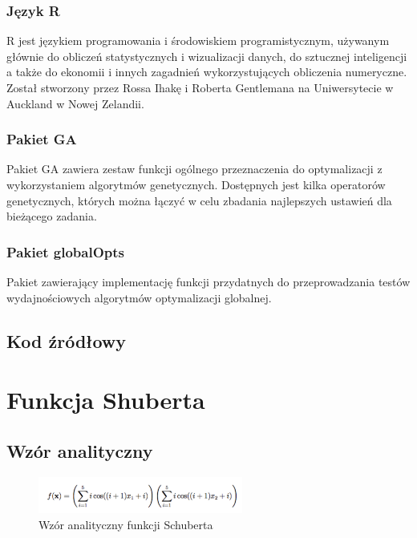 \documentclass{article}
\begin{document}
\subsubsection{Język R}
R jest językiem programowania i środowiskiem programistycznym, używanym głównie do obliczeń statystycznych i wizualizacji danych, do sztucznej inteligencji a także do ekonomii i innych zagadnień wykorzystujących obliczenia numeryczne. Został stworzony przez Rossa Ihakę i Roberta Gentlemana na Uniwersytecie w Auckland w Nowej Zelandii. 


\subsubsection{Pakiet GA}

Pakiet GA zawiera zestaw funkcji ogólnego przeznaczenia do optymalizacji z wykorzystaniem algorytmów genetycznych. Dostępnych jest kilka operatorów genetycznych, których można łączyć w celu zbadania najlepszych ustawień dla bieżącego zadania.


\subsubsection{Pakiet globalOpts}
Pakiet zawierający implementację funkcji przydatnych do przeprowadzania testów wydajnościowych algorytmów optymalizacji globalnej.

\subsection{Kod źródłowy}

\clearpage
\section{Funkcja Shuberta}
	\subsection{Wzór analityczny}
	   \begin{figure}[!htbp]
    \centering
    \includegraphics[width=0.6\textwidth]{inc/wzory/schubert}
     \caption{Wzór analityczny funkcji Schuberta}
    \end{figure}
    
    
 
\end{document}
